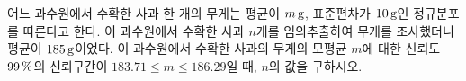 어느 과수원에서 수확한 사과 한 개의 무게는 평균이 $m\mkern3mu \mathrm{g}$, 표준편차가 $10\mkern3mu \mathrm{g}$인 정규분포를 따른다고 한다. 이 과수원에서 수확한 사과 $n$개를 임의추출하여 무게를 조사했더니 평균이 $185\mkern3mu \mathrm{g}$이었다. 이 과수원에서 수확한 사과의 무게의 모평균 $m$에 대한 신뢰도 $99\mkern3mu \%$의 신뢰구간이 $183.71\le m\le 186.29$일 때, $n$의 값을 구하시오. 
